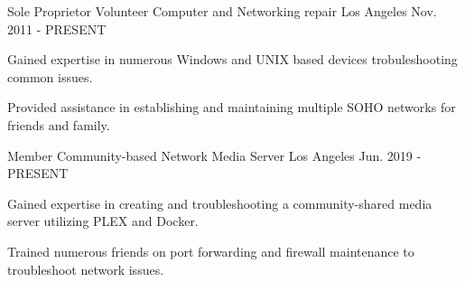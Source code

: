 


\begin{cventries}


\cventry
{Sole Proprietor} %
{Volunteer Computer and Networking repair} %
{Los Angeles} %
{Nov. 2011 - PRESENT} %
{ %
\begin{cvitems}
\item {Gained expertise in numerous Windows and UNIX based devices trobuleshooting common issues.}
\item {Provided assistance in establishing and maintaining multiple SOHO networks for friends and family.}
\end{cvitems}
}


\cventry
{Member} %
{Community-based Network Media Server} %
{Los Angeles} %
{Jun. 2019 - PRESENT} %
{ %
\begin{cvitems}
\item {Gained expertise in creating and troubleshooting a community-shared media server utilizing PLEX and Docker.}
\item {Trained numerous friends on port forwarding and firewall maintenance to troubleshoot network issues.}
\end{cvitems}
}


\end{cventries}